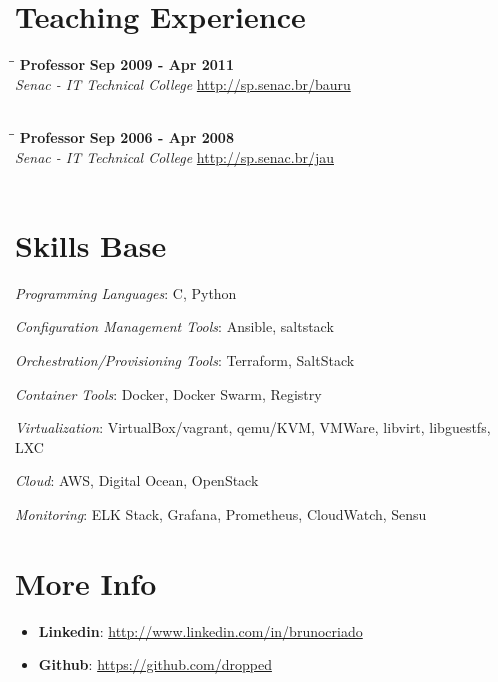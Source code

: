 \documentclass[margin]{res}
\begin{document}
\begin{resume}
\section{Teaching Experience}

\vspace{-0.1in}
\begin{tabbing}
  \hspace{2.3in}\= \hspace{1.7in}\= \kill %
  \textbf{Professor}    \>\>\textbf{Sep 2009 - Apr 2011}\\
  \textit{Senac - IT Technical College} \url{http://sp.senac.br/bauru}\\\\
\end{tabbing}\vspace{-20pt}      %

\vspace{-0.1in}
\begin{tabbing}
  \hspace{2.3in}\= \hspace{1.7in}\= \kill %
  \textbf{Professor}    \>\>\textbf{Sep 2006 - Apr 2008}\\
  \textit{Senac - IT Technical College} \url{http://sp.senac.br/jau}\\\\
\end{tabbing}\vspace{-20pt}      %


\section{Skills Base}
\textit{Programming Languages}: C, Python

\textit{Configuration Management Tools}: Ansible, saltstack

\textit{Orchestration/Provisioning Tools}: Terraform, SaltStack

\textit{Container Tools}: Docker, Docker Swarm, Registry

\textit{Virtualization}: VirtualBox/vagrant, qemu/KVM, VMWare, libvirt, libguestfs, LXC

\textit{Cloud}: AWS, Digital Ocean, OpenStack

\textit{Monitoring}: ELK Stack, Grafana, Prometheus, CloudWatch, Sensu


\section{More Info}
\begin{itemize}
\item \textbf{Linkedin}: \url{http://www.linkedin.com/in/brunocriado}
\item \textbf{Github}: \url{https://github.com/dropped}
\end{itemize}

\end{resume}
\end{document}
